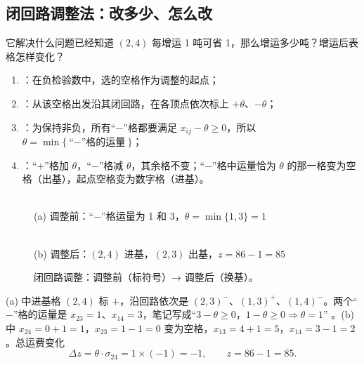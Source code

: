 \subsection{闭回路调整法：改多少、怎么改}
\noindent\textsf{\color{blue2}它解决什么问题}\quad 已经知道 $(2,4)$ 每增运 1 吨可省 1，那么增运多少吨？增运后表格怎样变化？

\begin{summarybox}
\begin{enumerate}[label=\arabic*.]
\item {}：在负检验数中，选的空格作为调整的起点；
\item {}：从该空格出发沿其闭回路，在各顶点依次标上 $+\theta$、$-\theta$；
\item {}：为保持非负，所有“$-$”格都要满足 $x_{ij}-\theta\ge0$，所以 $\theta=\min\{\text{“$-$”格的运量}\}$；
\item {}：“$+$”格加 $\theta$，“$-$”格减 $\theta$，其余格不变；“$-$”格中运量恰为 $\theta$ 的那一格变为空格（出基），起点空格变为数字格（进基）。
\end{enumerate}
\end{summarybox}

\begin{figure}[H]
\centering
\begin{minipage}{0.48\linewidth}\centering
{}\\{\small (a) 调整前：“$-$”格运量为 1 和 3，$\theta=\min\{1,3\}=1$}
\end{minipage}\hfill
\begin{minipage}{0.48\linewidth}\centering
{}\\{\small (b) 调整后：$(2,4)$ 进基，$(2,3)$ 出基，$z=86-1=85$}
\end{minipage}
\caption{闭回路调整：调整前（标符号）→ 调整后（换基）。}\label{fig:adjust}
\end{figure}
(a) 中进基格 $(2,4)$ 标 $+$，沿回路依次是 $(2,3)^-$、$(1,3)^+$、$(1,4)^-$。两个“$-$”格的运量是 $x_{23}=1$、$x_{14}=3$，笔记写成“$3-\theta\ge0$，$1-\theta\ge0\Rightarrow\theta=1$” \orig。(b) 中 $x_{24}=0+1=1$，$x_{23}=1-1=0$ 变为空格，$x_{13}=4+1=5$，$x_{14}=3-1=2$。总运费变化
\[
\Delta z=\theta\cdot\sigma_{24}=1\times(-1)=-1,\qquad z=86-1=85.
\]

